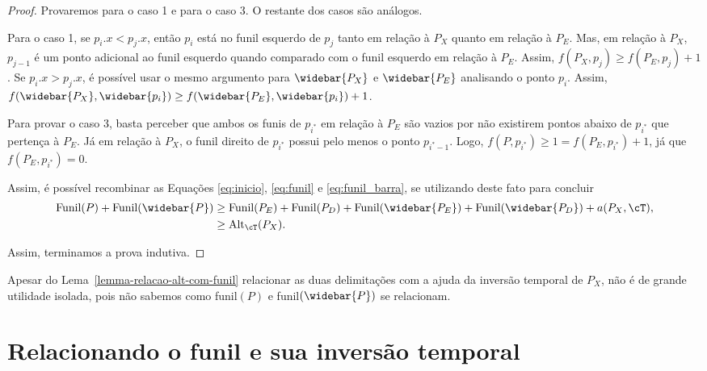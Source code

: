 \begin{proof}
    Provaremos para o caso 1 e para o caso 3. O restante dos casos são análogos.

    Para o caso 1, se $p_i.x < p_j.x$, então $p_i$ está no funil esquerdo de $p_j$ tanto em relação à $P_X$ quanto em relação à $P_E$. Mas, em relação à $P_X$, $p_{j-1}$ é um ponto adicional ao funil esquerdo quando comparado com o funil esquerdo em relação à $P_E$. Assim, $f(P_X,p_j) \geq f(P_E,p_j) + 1$.
    Se $p_i.x > p_j.x$, é possível usar o mesmo argumento para $\widebar{P_X}$ e $\widebar{P_E}$ analisando o ponto $p_i$. Assim, $f(\widebar{P_X},\widebar{p_i}) \geq f(\widebar{P_E},\widebar{p_i}) + 1$.

    Para provar o caso 3, basta perceber que ambos os funis de $p_{i^{*}}$ em relação à $P_E$ são vazios por não existirem pontos abaixo de $p_{i^{*}}$ que pertença à $P_E$. Já em relação à $P_X$, o funil direito de $p_{i^{*}}$ possui pelo menos o ponto $p_{i^{*} - 1}$. Logo, $f(P,p_{i^{*}}) \geq 1 = f(P_E,p_{i^{*}}) + 1$, já que $f(P_E,p_{i^{*}}) = 0$. 

    Assim, é possível recombinar as Equações \ref{eq:inicio}, \ref{eq:funil} e \ref{eq:funil_barra}, se utilizando deste fato para concluir
    \begin{align*}
        \text{Funil}(P) + \text{Funil}(\widebar{P}) &\geq \text{Funil}(P_E) + \text{Funil}(P_D) + \text{Funil}(\widebar{P_E}) + \text{Funil}(\widebar{P_D}) + a(P_X,\cT), \notag \\
        &\geq \text{Alt}_{\cT}(P_X).
    \end{align*}

    Assim, terminamos a prova indutiva.
\end{proof}

Apesar do Lema~\ref{lemma-relacao-alt-com-funil} relacionar as duas delimitações com a ajuda da inversão temporal de $P_X$, não é de grande utilidade isolada, pois não sabemos como funil$(P)$ e funil$(\widebar{P})$ se relacionam.

\section{Relacionando o funil e sua inversão temporal}
